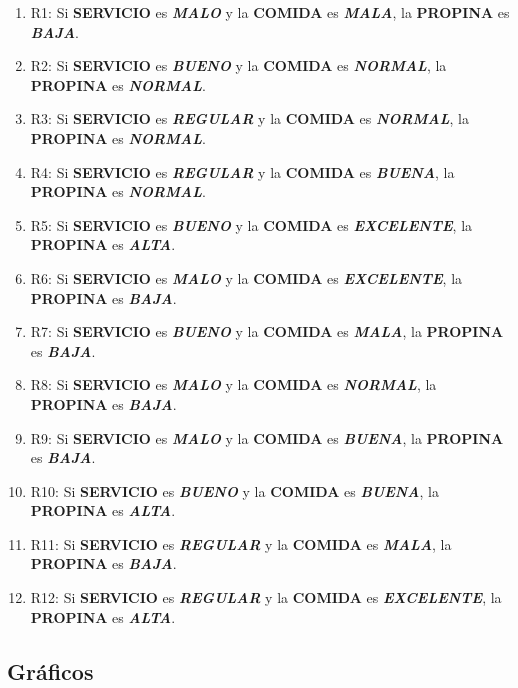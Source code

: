 \documentclass[11pt, letterpaper]{article}
\begin{document}
\begin{enumerate}
	\item R1: Si \textbf{SERVICIO} es \textbf{\textit{MALO}} y la \textbf{COMIDA} es \textbf{\textit{MALA}}, la \textbf{PROPINA} es \textbf{\textit{BAJA}}.
	\item R2: Si \textbf{SERVICIO} es \textbf{\textit{BUENO}} y la \textbf{COMIDA} es \textbf{\textit{NORMAL}}, la \textbf{PROPINA} es \textbf{\textit{NORMAL}}.
	\item R3: Si \textbf{SERVICIO} es \textbf{\textit{REGULAR}} y la \textbf{COMIDA} es \textbf{\textit{NORMAL}}, la \textbf{PROPINA} es \textbf{\textit{NORMAL}}.
	\item R4: Si \textbf{SERVICIO} es \textbf{\textit{REGULAR}} y la \textbf{COMIDA} es \textbf{\textit{BUENA}}, la \textbf{PROPINA} es \textbf{\textit{NORMAL}}.
	\item R5: Si \textbf{SERVICIO} es \textbf{\textit{BUENO}} y la \textbf{COMIDA} es \textbf{\textit{EXCELENTE}}, la \textbf{PROPINA} es \textbf{\textit{ALTA}}.
	\item R6: Si \textbf{SERVICIO} es \textbf{\textit{MALO}} y la \textbf{COMIDA} es \textbf{\textit{EXCELENTE}}, la \textbf{PROPINA} es \textbf{\textit{BAJA}}.
	\item R7: Si \textbf{SERVICIO} es \textbf{\textit{BUENO}} y la \textbf{COMIDA} es \textbf{\textit{MALA}}, la \textbf{PROPINA} es \textbf{\textit{BAJA}}.
	\item R8: Si \textbf{SERVICIO} es \textbf{\textit{MALO}} y la \textbf{COMIDA} es \textbf{\textit{NORMAL}}, la \textbf{PROPINA} es \textbf{\textit{BAJA}}.
	\item R9: Si \textbf{SERVICIO} es \textbf{\textit{MALO}} y la \textbf{COMIDA} es \textbf{\textit{BUENA}}, la \textbf{PROPINA} es \textbf{\textit{BAJA}}.
	\item R10: Si \textbf{SERVICIO} es \textbf{\textit{BUENO}} y la \textbf{COMIDA} es \textbf{\textit{BUENA}}, la \textbf{PROPINA} es \textbf{\textit{ALTA}}.
	\item R11: Si \textbf{SERVICIO} es \textbf{\textit{REGULAR}} y la \textbf{COMIDA} es \textbf{\textit{MALA}}, la \textbf{PROPINA} es \textbf{\textit{BAJA}}.
	\item R12: Si \textbf{SERVICIO} es \textbf{\textit{REGULAR}} y la \textbf{COMIDA} es \textbf{\textit{EXCELENTE}}, la \textbf{PROPINA} es \textbf{\textit{ALTA}}.
\end{enumerate}


\subsection{Gráficos}
\end{document}
